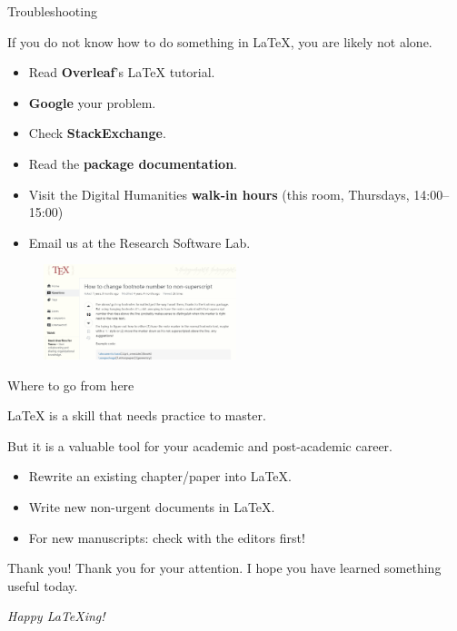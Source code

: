 \documentclass{beamer}
\begin{document}
\begin{frame}{Troubleshooting}

    If you do not know how to do something in \LaTeX, you are likely not alone.

    \medskip

    \begin{itemize}
        \item Read \textbf{Overleaf}'s \LaTeX{} tutorial.
        \item \textbf{Google} your problem.
        \item Check \textbf{StackExchange}.
        \item Read the \textbf{package documentation}.
        \item Visit the Digital Humanities \textbf{walk-in hours} (this room, Thursdays, 14:00--15:00)
        \item Email us at the Research Software Lab.
    \end{itemize}

    \medskip

    \begin{figure}[ht]
        \centering
        \includegraphics[width=0.5\textwidth]{./assets/stackexchange.png}
    \end{figure}

\end{frame}

\begin{frame}{Where to go from here}

    \LaTeX{} is a skill that needs practice to master.

    \medskip

    But it is a valuable tool for your academic and post-academic career.

    \medskip

    \begin{itemize}
        \item Rewrite an existing chapter/paper into \LaTeX.
        \item Write new non-urgent documents in \LaTeX.
        \item For new manuscripts: check with the editors first!
    \end{itemize}
\end{frame}

\begin{frame}{Thank you!}
    Thank you for your attention. I hope you have learned something useful today.
    \medskip
    \begin{center}
        \textit{Happy \LaTeX{}ing!}
    \end{center}
\end{frame}
\end{document}
